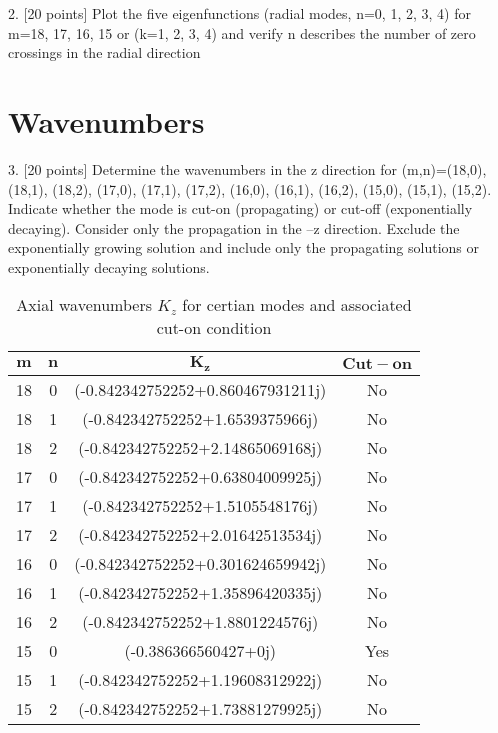 \documentclass[]{aiaa-tc}%
\begin{document}
2. [20 points] Plot the five eigenfunctions (radial modes, n=0, 1, 2, 3, 4) for m=18, 17, 16, 15 or (k=1, 2, 3, 4) and verify n describes the number of zero crossings in the radial direction

\section{Wavenumbers}

3. [20 points] Determine the wavenumbers in the z direction for (m,n)=(18,0), (18,1), (18,2), (17,0), (17,1), (17,2), (16,0), (16,1), (16,2), (15,0), (15,1), (15,2). Indicate whether the mode is cut-on (propagating) or cut-off (exponentially decaying). Consider only the propagation in the –z direction. Exclude the exponentially growing solution and include only the propagating solutions or exponentially decaying solutions.

\begin{table}[htb]
\begin{centering}
\begin{tabular}{| c c c c |}
\hline
$\mathbf{m}$ &  $\mathbf{n}$ &                      $\mathbf{K_z}$ & $\mathbf{Cut-on}$ \\
\hline
18 &             0 &  (-0.842342752252+0.860467931211j) &                No \\
18 &             1 &    (-0.842342752252+1.6539375966j) &                No \\
18 &             2 &   (-0.842342752252+2.14865069168j) &                No \\
\hline
17 &             0 &  (-0.842342752252+0.63804009925j) &                No \\
17 &             1 &   (-0.842342752252+1.5105548176j) &                No \\
17 &             2 &  (-0.842342752252+2.01642513534j) &                No \\
\hline
16 &             0 &  (-0.842342752252+0.301624659942j) &                No \\
16 &             1 &   (-0.842342752252+1.35896420335j) &                No \\
16 &             2 &    (-0.842342752252+1.8801224576j) &                No \\
\hline
15 &             0 &              (-0.386366560427+0j) &               Yes \\
15 &             1 &  (-0.842342752252+1.19608312922j) &                No \\
15 &             2 &  (-0.842342752252+1.73881279925j) &                No \\
\hline
\end{tabular}
\caption{Axial wavenumbers $K_z$ for certian modes and associated cut-on condition}
\end{centering}
\end{table}
\end{document}
